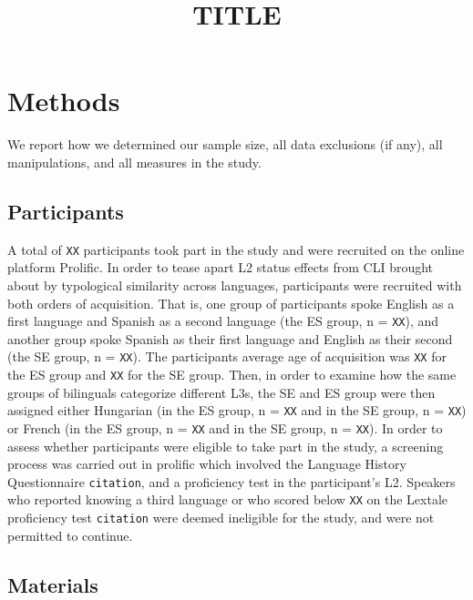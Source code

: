 \documentclass[
  english,
  man]{apa6}
\title{TITLE}
\author{\phantom{0}}
\date{}
\affiliation{\phantom{0}}
\begin{document}
\maketitle

\hypertarget{methods}{%
\section{Methods}\label{methods}}

We report how we determined our sample size, all data exclusions (if any), all manipulations, and all measures in the study.

\hypertarget{participants}{%
\subsection{Participants}\label{participants}}

A total of \texttt{XX} participants took part in the study and were recruited on the online platform Prolific. In order to tease apart L2 status effects from CLI brought about by typological similarity across languages, participants were recruited with both orders of acquisition. That is, one group of participants spoke English as a first language and Spanish as a second language (the ES group, n = \texttt{XX}), and another group spoke Spanish as their first language and English as their second (the SE group, n = \texttt{XX}). The participants average age of acquisition was \texttt{XX} for the ES group and \texttt{XX} for the SE group. Then, in order to examine how the same groups of bilinguals categorize different L3s, the SE and ES group were then assigned either Hungarian (in the ES group, n = \texttt{XX} and in the SE group, n = \texttt{XX}) or French (in the ES group, n = \texttt{XX} and in the SE group, n = \texttt{XX}). In order to assess whether participants were eligible to take part in the study, a screening process was carried out in prolific which involved the Language History Questionnaire \texttt{citation}, and a proficiency test in the participant's L2. Speakers who reported knowing a third language or who scored below \texttt{XX} on the Lextale proficiency test \texttt{citation} were deemed ineligible for the study, and were not permitted to continue.

\hypertarget{materials}{%
\subsection{Materials}\label{materials}}
\end{document}
